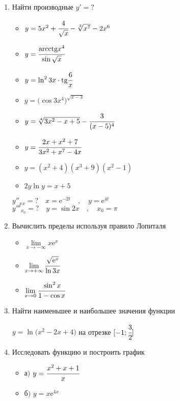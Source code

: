 \documentclass{article}
\begin{document}
\begin{multicols}{2}
\begin{enumerate}[label=\arabic*.]
		\item Найти производные $y'=?$
		\begin{multicols}{2}
			\begin{itemize}[label=""]
				\item $y=5x^2+\cfrac{4}{\sqrt{x}}-\sqrt[3]{x^7}-2x^6$
				\item $y=\cfrac{\mbox{arcctg}x^4}{\sin \sqrt{x}}$
				\item $y=\ln^2 3x \cdot \mbox{tg}\cfrac{6}{x}$
				\item $y=\Big( \cos 3x^4 \Big)^{\sqrt{x-3}}$
			\end{itemize}
			\vfill\null\columnbreak
			\begin{itemize}[label=""]
				\item $y=\sqrt[4]{3x^2-x+5} - \cfrac{3}{(x-5)^4}$
				\item $y=\cfrac{2x+x^2+7}{3x^2+x^7-4x}$
				\item $y=(x^2+4)(x^3 + 9)(x^2 - 1)$
				\item $2y\ln y = x+5$
			\end{itemize}
		\end{multicols}
		\vspace{-3mm}
		$y''_{xx}=? \quad x=\mbox{e}^{-2t} \quad,\quad y=\mbox{e}^{4t}$ \\
		$y'''_{x_0}=? \quad y=\sin 2x \quad,\quad x_0=\pi$
		\item Вычислить пределы используя правило Лопиталя
		\begin{multicols}{3}
			\raggedcolumns
			\begin{itemize}[label=""]
				\item $\lim\limits_{x\to-\infty} x\mbox{e}^x$
				\vfill\null\columnbreak
				\item $\lim\limits_{x\to+\infty}\cfrac{\sqrt{\mbox{e}^x}}{\ln 3x}$
				\vfill\null\columnbreak
				\item $\lim\limits_{x\to 0}\cfrac{\sin^2 x}{1-\cos x}$
				\vfill\null\columnbreak
			\end{itemize}
		\end{multicols}
		\vspace{-4mm}	
		\item Найти наименьшее и наибольшее значения функции
		
		$y=\ln\big(x^2-2x+4\big)$ на отрезке $[-1;\cfrac{3}{2}]$
		\item Исследовать функцию и построить график
		\begin{multicols}{2}
			\begin{itemize}[label=""]
				\setlength\itemsep{0.5em}
				\item а$)$ $y=\cfrac{x^2+x+1}{x}$
			\end{itemize}
			\vfill\null\columnbreak
			\begin{itemize}[label=""]
				\setlength\itemsep{0.5em}
				\item б$)$ $y=x\mbox{e}^{4x}$
			\end{itemize}
		\end{multicols}
	\end{enumerate}	
\end{multicols}
\end{document}

